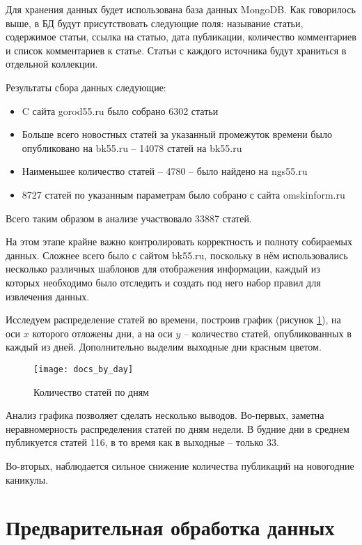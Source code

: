 Для хранения данных будет использована база данных MongoDB. Как говорилось выше, в БД будут присутствовать следующие поля: называние статьи, содержимое статьи, ссылка на статью, дата публикации, количество комментариев и список комментариев к статье. Статьи с каждого источника будут храниться в отдельной коллекции.

Результаты сбора данных следующие:
\begin{itemize}
\item C сайта gorod55.ru было собрано 6302 статьи
\item Больше всего новостных статей за указанный промежуток времени было опубликовано на bk55.ru -- 14078 статей  на bk55.ru
\item Наименьшее количество статей -- 4780 -- было найдено на ngs55.ru
\item 8727 статей по указанным параметрам было собрано с сайта omskinform.ru
\end{itemize}

Всего таким образом в анализе участвовало 33887 статей.

На этом этапе крайне важно контролировать корректность и полноту собираемых данных. Сложнее всего было с сайтом bk55.ru, поскольку в нём использовались несколько различных шаблонов для отображения информации, каждый из которых необходимо было отследить и создать под него набор правил для извлечения данных.

Исследуем распределение статей во времени, построив график (рисунок \ref{fig:docs_by_day}), на оси $x$ которого отложены дни, а на оси $y$ -- количество статей, опубликованных в каждый из дней. Дополнительно выделим выходные дни красным цветом.

\begin{figure}
	\centering
    \texttt{[image: docs\_by\_day]}
    \caption{Количество статей по дням}
    \label{fig:docs_by_day}
\end{figure}

Анализ графика позволяет сделать несколько выводов. Во-первых, заметна неравномерность распределения статей по дням недели. В будние дни в среднем публикуется статей 116, в то время как в выходные -- только 33. 

Во-вторых, наблюдается сильное снижение количества публикаций на новогодние каникулы.

\section{Предварительная обработка данных}

